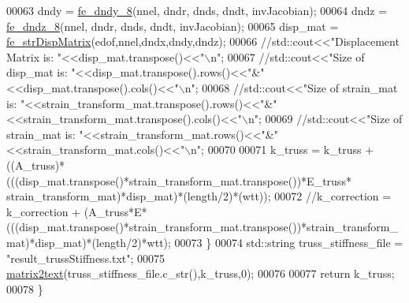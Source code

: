 \begin{DoxyCode}
00063                 dndy = \hyperlink{functions_8h_a0572d7818e085c67f7fbb84eef8ecfb4}{fe\_dndy\_8}(nnel, dndr, dnds, dndt, invJacobian);
00064                 dndz = \hyperlink{functions_8h_aaf75db8433433807839c6ea17f2cf72c}{fe\_dndz\_8}(nnel, dndr, dnds, dndt, invJacobian);
00065                 disp\_mat = \hyperlink{functions_8h_a4b49d2df4f86e7d0755971ab4bfa48b2}{fe\_strDispMatrix}(edof,nnel,dndx,dndy,dndz);
00066         \textcolor{comment}{//std::cout<<"Displacement Matrix is: "<<disp\_mat.transpose()<<"\(\backslash\)n";}
00067         \textcolor{comment}{//std::cout<<"Size of disp\_mat is:
       "<<disp\_mat.transpose().rows()<<"&"<<disp\_mat.transpose().cols()<<"\(\backslash\)n";}
00068         \textcolor{comment}{//std::cout<<"Size of strain\_mat is:
       "<<strain\_transform\_mat.transpose().rows()<<"&"<<strain\_transform\_mat.transpose().cols()<<"\(\backslash\)n";}
00069         \textcolor{comment}{//std::cout<<"Size of strain\_mat is:
       "<<strain\_transform\_mat.rows()<<"&"<<strain\_transform\_mat.cols()<<"\(\backslash\)n";}
00070 
00071         k\_truss = k\_truss + ((A\_truss)*(((disp\_mat.transpose()*strain\_transform\_mat.transpose())*E\_truss*
      strain\_transform\_mat)*disp\_mat)*(length/2)*(wtt));
00072         \textcolor{comment}{//k\_correction = k\_correction +
       (A\_truss*E*(((disp\_mat.transpose()*strain\_transform\_mat.transpose())*strain\_transform\_mat)*disp\_mat)*(length/2)*wtt);}
00073     \}   
00074     std::string truss\_stiffness\_file = \textcolor{stringliteral}{"result\_trussStiffness.txt"};
00075     \hyperlink{functions_8h_a346547477d2a1fbeff6b5e0b05314283}{matrix2text}(truss\_stiffness\_file.c\_str(),k\_truss,0);
00076 
00077     \textcolor{keywordflow}{return} k\_truss;
00078 \}
\end{DoxyCode}
